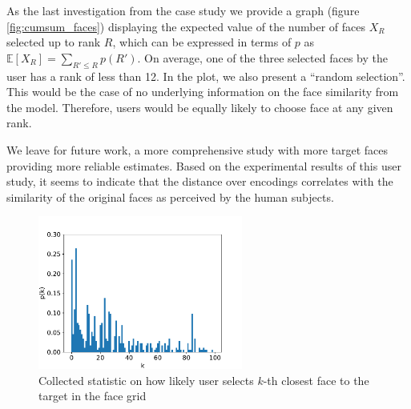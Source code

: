 As the last investigation from the case study we provide a graph (figure \ref{fig:cumsum_faces}) displaying the expected value of the number of faces $X_R$ selected up to rank $R$, which can be expressed in terms of $p$ as $\mathbb{E}[X_R] = \sum_{R' \leq R}p(R')$. On average, one of the three selected faces by the user has a rank of less than 12. In the plot, we also present a ``random selection''. This would be the case of no underlying information on the face similarity from the model. Therefore, users would be equally likely to choose face at any given rank.

We leave for future work, a more comprehensive study with more target faces providing more reliable estimates. Based on the experimental results of this user study, it seems to indicate that the distance over encodings correlates with the similarity of the original faces as perceived by the human subjects.

\begin{figure}
    \centering
    \includegraphics[width=0.6\textwidth]{graphs/survey_distribution_without_the_easy.pdf}
    
    \caption{Collected statistic on how likely user selects $k$-th closest face to the target in the face grid}
    \label{fig:survey_distribution}
\end{figure}


